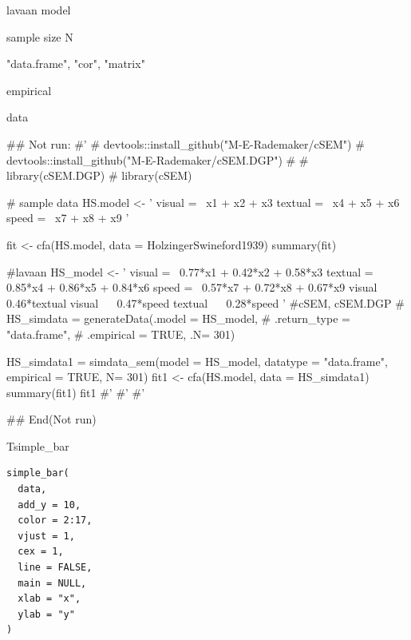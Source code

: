 \documentclass[a4paper]{book}
\begin{document}
%
\begin{Arguments}
\begin{ldescription}
\item[\code{model}] lavaan model

\item[\code{N}] sample size N

\item[\code{datatype}] "data.frame", "cor", "matrix"

\item[\code{empirical}] empirical
\end{ldescription}
\end{Arguments}
%
\begin{Value}
data
\end{Value}
%
\begin{Examples}
\begin{ExampleCode}

## Not run: 
#'
# devtools::install_github("M-E-Rademaker/cSEM")
# devtools::install_github("M-E-Rademaker/cSEM.DGP")
#
# library(cSEM.DGP)
# library(cSEM)

# sample data
HS.model <- ' visual  =~ x1 + x2 + x3
              textual =~ x4 + x5 + x6
              speed   =~ x7 + x8 + x9
              '

fit <- cfa(HS.model, data = HolzingerSwineford1939)
summary(fit)

#lavaan
HS_model <- ' visual  =~ 0.77*x1 + 0.42*x2 + 0.58*x3
              textual =~ 0.85*x4 + 0.86*x5 + 0.84*x6
              speed   =~ 0.57*x7 + 0.72*x8 + 0.67*x9
              visual ~~  0.46*textual
              visual ~~  0.47*speed
              textual ~~  0.28*speed
          '
#cSEM, cSEM.DGP
# HS_simdata = generateData(.model = HS_model,
#                           .return_type = "data.frame",
#                           .empirical = TRUE, .N= 301)

HS_simdata1 = simdata_sem(model = HS_model,
                          datatype = "data.frame",
                          empirical = TRUE, N= 301)
fit1 <- cfa(HS.model, data = HS_simdata1)
summary(fit1)
fit1 %
#'
#'
#'


## End(Not run)
\end{ExampleCode}
\end{Examples}
%
\begin{Description}
Tsimple\_bar
\end{Description}
%
\begin{Usage}
\begin{verbatim}
simple_bar(
  data,
  add_y = 10,
  color = 2:17,
  vjust = 1,
  cex = 1,
  line = FALSE,
  main = NULL,
  xlab = "x",
  ylab = "y"
)
\end{verbatim}
\end{Usage}
\end{document}
